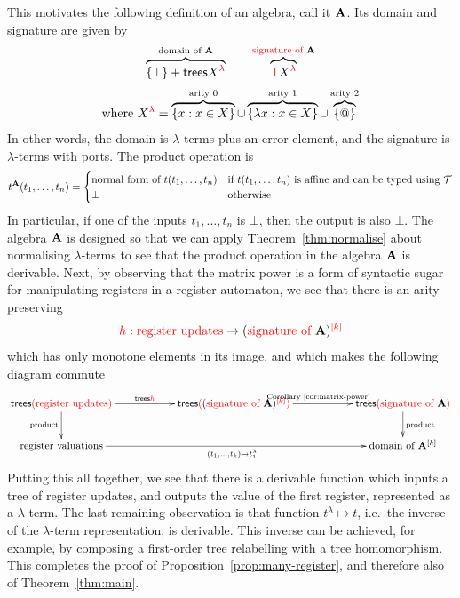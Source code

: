 This motivates the  following definition of an algebra, call it $\alg$. Its domain and signature are given by 
\begin{align*}
\overbrace{\set \bot + \trees \lamrank X}^{\algdom \alg}  \qquad \overbrace{ \tmonad \lamrank X}^{\algops \alg} 
\end{align*}
\begin{align*}
\text{where }\lamrank X = {\overbrace{\set{x : x \in X}}^{\text{arity 0}} \cup \overbrace{\set{\lambda x : x \in X}}^{\text{arity 1}} \cup  \overbrace{\set @}^{\text{arity 2}}}
\end{align*}
In other words, the domain is $\lambda$-terms plus an error element, and the signature is $\lambda$-terms  with ports. The   product operation is 
\begin{align*}
t^\alg(t_1,\ldots,t_n) = \begin{cases}
    \text{normal form of $t(t_1,\ldots,t_n)$} & \text{if $t(t_1,\ldots,t_n)$ is affine and can be typed using $\Tt$}\\
    \bot & \text{otherwise}
\end{cases}
\end{align*}
In particular, if one of the inputs $t_1,\ldots,t_n$ is $\bot$, then the output is also $\bot$.  The algebra $\alg$ is designed so that we can apply Theorem~\ref{thm:normalise} about normalising $\lambda$-terms to see that the  product operation in the  algebra $\alg$ is derivable. Next, by observing that the matrix power is a form of syntactic sugar for manipulating registers in a register automaton, we see that there is an arity preserving 
    \begin{align*}
    \ranked h : \regups \to \mati k {(\algops \alg)}
    \end{align*}
    which has only monotone elements in its image, and which makes the following diagram commute
    \begin{align*}
    \xymatrix@C=2cm{
        \treepar {\regups} \ar[r]^-{\trees \ranked h}\ar[d]_{\text{product}} &
         \treepar {\mati k {(\algops \alg)}}\ar[r]^{\text{Corollary~\ref{cor:matrix-power}}}  & 
         \treepar {\algops \alg} \ar[d]^{\text{product}} \\
        \regvalss \ar[rr]_{(t_1,\ldots,t_k) \mapsto t^\lambda_1}&  & \algdom {\alg^{[k]}}
    }
    \end{align*} 
Putting this all together, we see that there is a derivable function which inputs a tree of register updates, and outputs the value of the first register, represented as a $\lambda$-term. The last remaining observation is that function $t^\lambda \mapsto t$, i.e.~the inverse of the $\lambda$-term representation, is derivable. This inverse can be achieved, for example, by composing a first-order tree relabelling with a tree homomorphism. This completes the proof of Proposition~\ref{prop:many-register}, and therefore also of Theorem~\ref{thm:main}. 